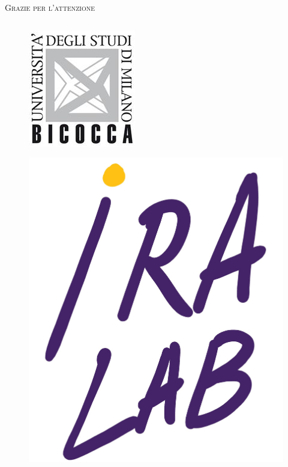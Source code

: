 \documentclass{beamer}
\begin{document}
\begin{tframe}
    \centering
    \Huge \textsc{Grazie per l'attenzione}
    
    \vspace{5mm}
    
    \begin{columns}
        \begin{column}{0.45\textwidth}
            \begin{figure}
                \centering
                \includegraphics[width=0.4\columnwidth]{img/bicocca.jpg}
            \end{figure}
            \begin{figure}
                \centering
                \includegraphics[width=0.4\columnwidth]{img/ira.jpg}
            \end{figure}
        \end{column}
    

\end{columns}
\end{tframe}
\end{document}
